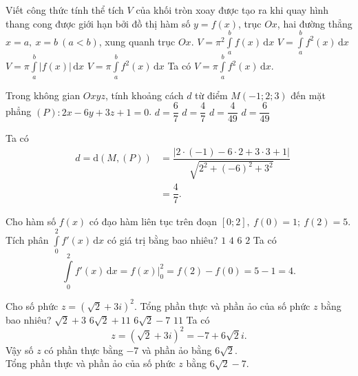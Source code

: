 \begin{ex}%
	Viết công thức tính thể tích $V$ của khối tròn xoay được tạo ra khi quay hình thang cong được giới hạn bởi đồ thị hàm số $y=f(x)$,  trục $Ox$,  hai đường thẳng $x=a,~x=b~(a<b)$, xung quanh trục $Ox$.
	\choice
	{$V=\pi^2\displaystyle\int\limits_a^b f(x)\mathrm{\,d}x$}
	{$V=\displaystyle\int\limits_a^b f^2(x)\mathrm{\,d}x$}
	{$V=\pi\displaystyle\int\limits_a^b |f(x)|\mathrm{\,d}x$}
	{\True $V=\pi\displaystyle\int\limits_a^b f^2(x)\mathrm{\,d}x$}
	\loigiai
	{
		Ta có $V=\pi\displaystyle\int\limits_a^b f^2(x)\mathrm{\,d}x$.
	}
\end{ex}

\begin{ex}%
	Trong không gian $Oxyz$, tính khoảng cách $d$ từ điểm $M(-1;2;3)$ đến mặt phẳng $(P)\colon2x-6y+3z+1=0$.
	\choice
	{$d=\dfrac{6}{7}$}
	{\True $d=\dfrac{4}{7}$}
	{$d=\dfrac{4}{49}$}
	{$d=\dfrac{6}{49}$}
	\loigiai
	{
		Ta có 
		\begin{eqnarray*}
			 &d=\mathrm{d}(M,(P))&=\dfrac{|2\cdot(-1)-6\cdot2+3\cdot3+1|}{\sqrt{2^2+(-6)^2+3^2}} \\
			 & &= \dfrac{4}{7}.
		\end{eqnarray*}
	
	}
\end{ex}

\begin{ex}%
	Cho hàm số $f(x)$ có đạo hàm liên tục trên đoạn $[0;2],~f(0)=1;~f(2)=5$. Tích phân $\displaystyle\int\limits_0^2 f'(x)\mathrm{\,d}x$ có giá trị bằng bao nhiêu?
	\choice
	{$1$}
	{\True $4$}
	{$6$}
	{$2$}
	\loigiai
	{
		Ta có
	\[
		\displaystyle\int\limits_0^2 f'(x)\mathrm{\,d}x=f(x)\bigg|_0^2=f(2)-f(0)=5-1=4.
	\]
	}
\end{ex}

\begin{ex}%
	Cho số phức $z=\left(\sqrt{2}+3i\right)^2$. Tổng phần thực và phần ảo của số phức $z$ bằng bao nhiêu?
	\choice
	{$\sqrt{2}+3$}
	{$6\sqrt{2}+11$}
	{\True $6\sqrt{2}-7$}
	{$11$}
	\loigiai
	{
		Ta có 
		\[z=\left(\sqrt{2}+3i\right)^2=-7+6\sqrt{2}i.\]
		Vậy số $z$ có phần thực bằng $-7$ và phần ảo bằng $6\sqrt{2}$.\\
		Tổng phần thực và phần ảo của số phức $z$ bằng $6\sqrt{2}-7$.
	}
\end{ex}

